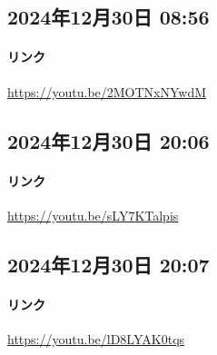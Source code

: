 \subsection*{2024年12月30日 08:56}

\paragraph{リンク}
\url{https://youtu.be/2MOTNxNYwdM}

\subsection*{2024年12月30日 20:06}

\paragraph{リンク}
\url{https://youtu.be/sLY7KTalpis}

\subsection*{2024年12月30日 20:07}

\paragraph{リンク}
\url{https://youtu.be/lD8LYAK0tqs}

